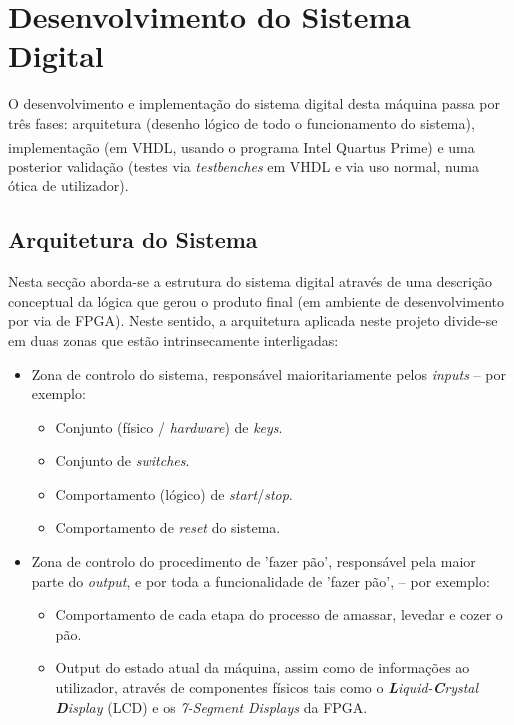 \documentclass{report}
\begin{document}
\chapter{Desenvolvimento do Sistema Digital}
\label{chap.desenvolvimentoSistemaDigital}
O desenvolvimento e implementação do sistema digital desta máquina passa por três fases: arquitetura (desenho lógico de todo o funcionamento do sistema), implementação (em VHDL, usando o programa Intel{\textsuperscript{\tiny{\textregistered}}} Quartus{\textsuperscript{\tiny{\textregistered}}} Prime) e uma posterior validação (testes via \textit{testbenches} em VHDL e via uso normal, numa ótica de utilizador).


\section{Arquitetura do Sistema}
Nesta secção aborda-se a estrutura do sistema digital através de uma descrição conceptual da lógica que gerou o produto final (em ambiente de desenvolvimento por via de FPGA). Neste sentido, a arquitetura aplicada neste projeto divide-se em duas zonas que estão intrinsecamente interligadas:
\begin{itemize}
	\item Zona de controlo do sistema, responsável maioritariamente pelos \textit{inputs} -- por exemplo:
	\begin{itemize}
		\item Conjunto (físico / \textit{hardware}) de \textit{keys}.
		\item Conjunto de \textit{switches}.
		\item Comportamento (lógico) de \textit{start}/\textit{stop}.
		\item Comportamento de \textit{reset} do sistema.
	\end{itemize}
	\item Zona de controlo do procedimento de 'fazer pão', responsável pela maior parte do \textit{output}, e por toda a funcionalidade de 'fazer pão', -- por exemplo:
	\begin{itemize}
		\item Comportamento de cada etapa do processo de amassar, levedar e cozer o pão.
		\item Output do estado atual da máquina, assim como de informações ao utilizador, através de componentes físicos tais como o \textit{\textbf{L}iquid-\textbf{C}rystal \textbf{D}isplay} (LCD) e os \textit{7-Segment Displays} da FPGA.
	\end{itemize}
\end{itemize}
\end{document}
